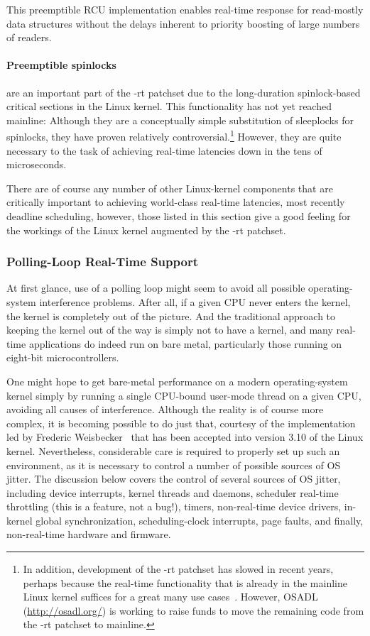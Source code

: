 This preemptible RCU implementation enables real-time response for
read-mostly data structures without the delays inherent to priority
boosting of large numbers of readers.

\paragraph{Preemptible spinlocks}
are an important part of the -rt patchset due to the long-duration
spinlock-based critical sections in the Linux kernel.
This functionality has not yet reached mainline: Although they are a conceptually
simple substitution of sleeplocks for spinlocks, they have proven relatively
controversial.\footnote{
	In addition, development of the -rt patchset has slowed in recent
	years, perhaps because the real-time functionality that is already
	in the mainline Linux kernel suffices for a great many use
	cases~\cite{JakeEdge2013Future-rtLinux,JakeEdge2014Future-rtLinux}.
	However, OSADL (\url{http://osadl.org/}) is working to raise funds
	to move the remaining code from the -rt patchset to mainline.}
However, they are quite necessary to the task of achieving real-time
latencies down in the tens of microseconds.

There are of course any number of other Linux-kernel components that are
critically important to achieving world-class real-time latencies,
most recently deadline scheduling,
however, those listed in this section give a good feeling for the workings
of the Linux kernel augmented by the -rt patchset.

\subsubsection{Polling-Loop Real-Time Support}
\label{sec:rt:Polling-Loop Real-Time Support}

At first glance, use of a polling loop might seem to avoid all possible
operating-system interference problems.
After all, if a given CPU never enters the kernel, the kernel is
completely out of the picture.
And the traditional approach to keeping the kernel out of the way is
simply not to have a kernel, and many real-time applications do
indeed run on bare metal, particularly those running on eight-bit
microcontrollers.

One might hope to get bare-metal performance on a modern operating-system
kernel simply by running a single CPU-bound user-mode thread on a
given CPU, avoiding all causes of interference.
Although the reality is of course more complex, it is becoming
possible to do just that,
courtesy of the  implementation led by
Frederic Weisbecker~\cite{JonCorbet2013NO-HZ-FULL} that has been
accepted into version 3.10 of the Linux kernel.
Nevertheless, considerable care is required to properly set up such
an environment, as it is necessary to control a number of possible
sources of OS jitter.
The discussion below covers the control of several sources of OS
jitter, including device interrupts, kernel threads and daemons,
scheduler real-time throttling (this is a feature, not a bug!),
timers, non-real-time device drivers, in-kernel global synchronization,
scheduling-clock interrupts, page faults, and finally, non-real-time
hardware and firmware.

